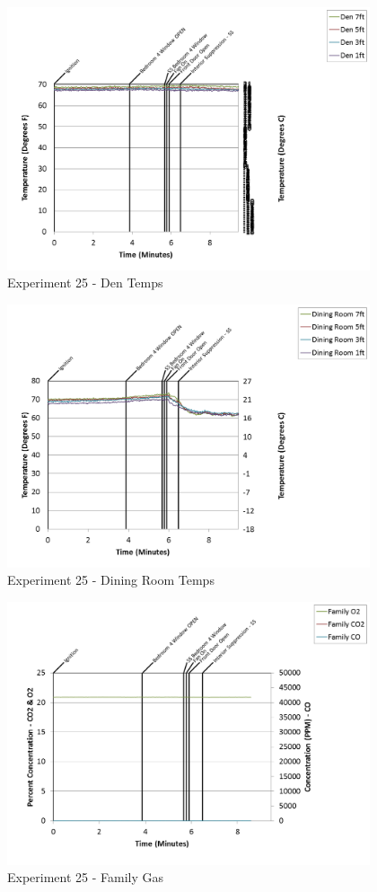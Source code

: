 \documentclass{article}
\begin{document}
\begin{appendices}
\begin{figure}[h!]
	\centering
	\includegraphics[height=3.05in]{0_Images/Results_Charts/Exp_25_Charts/DenTemps.png}
	\caption{Experiment 25 - Den Temps}
\end{figure}

\clearpage

\begin{figure}[h!]
	\centering
	\includegraphics[height=3.05in]{0_Images/Results_Charts/Exp_25_Charts/DiningRoomTemps.png}
	\caption{Experiment 25 - Dining Room Temps}
\end{figure}


\begin{figure}[h!]
	\centering
	\includegraphics[height=3.05in]{0_Images/Results_Charts/Exp_25_Charts/FamilyGas.png}
	\caption{Experiment 25 - Family Gas}
\end{figure}


\end{appendices}
\end{document}
